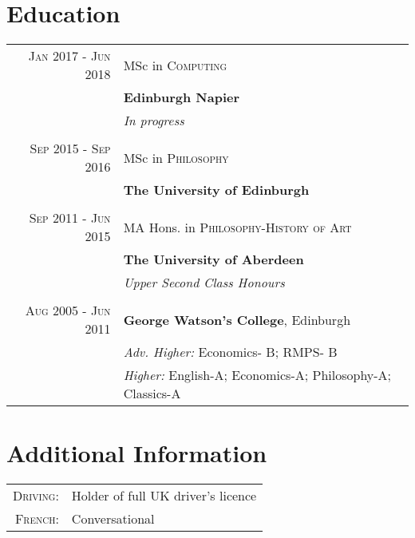 \documentclass[12pt, a4paper]{article}
\begin{document}
\section{Education}

\begin{tabular}{rl}	
\textsc{Jan} 2017 - \textsc{Jun} 2018 & MSc in \textsc{Computing} \\
&\textbf{Edinburgh Napier}\\
&\small\emph{In progress}\\
\\

\textsc{Sep} 2015 - \textsc{Sep} 2016 & MSc in \textsc{Philosophy} \\ 
&\textbf{The University of Edinburgh}\\
\\

\textsc{Sep} 2011 - \textsc{Jun} 2015& MA Hons. in \textsc{Philosophy}-\textsc{History of Art}\\ 
&\textbf{The University of Aberdeen}\\ 
&\small\emph{Upper Second Class Honours}\\
\\

\textsc{Aug} 2005 - \textsc{Jun} 2011&\textbf{George Watson's College}, Edinburgh\\
&\small \emph{Adv. Higher:} Economics- B; RMPS- B\\
&\footnotesize \emph{Higher:} English-A; Economics-A; Philosophy-A; Classics-A\\
\end{tabular}


\section{Additional Information}

\begin{tabular}{rl}

\textsc{Driving:} & Holder of full UK driver's licence\\
\textsc{French:} & Conversational\\

\end{tabular}
\end{document}
